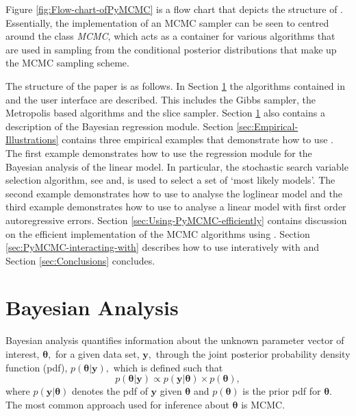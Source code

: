 \documentclass[article]{jss}
\begin{document}
Figure \ref{fig:Flow-chart-ofPyMCMC} is a flow chart that depicts
the structure of . Essentially, the implementation of an MCMC
sampler can be seen to centred around the class \emph{MCMC}, which
acts as a container for various algorithms that are used in sampling
from the conditional posterior distributions that make up the MCMC
sampling scheme. 

The structure of the paper is as follows. In Section \ref{sec:Bayesian-Analysis}
the algorithms contained in  and the user interface are described.
This includes the Gibbs sampler, the Metropolis based algorithms and
the slice sampler. Section \ref{sec:Bayesian-Analysis} also contains
a description of the Bayesian regression module. Section \ref{sec:Empirical-Illustrations}
contains three empirical examples that demonstrate how to use .
The first example demonstrates how to use the regression module for
the Bayesian analysis of the linear model. In particular, the stochastic
search variable selection algorithm, see \citet{GeorgeMcCulloch1993}
and\citet{MarinRobert2007}, is used to select a set of `most likely
models'. The second example demonstrates how to use  to analyse
the loglinear model and the third example demonstrates how to use
 to analyse a linear model with first order autoregressive errors.
Section \ref{sec:Using-PyMCMC-efficiently} contains discussion on
the efficient implementation of the MCMC algorithms using .
Section \ref{sec:PyMCMC-interacting-with} describes how to use 
interatively with  and Section \ref{sec:Conclusions} concludes.


\section{Bayesian Analysis}
\label{sec:Bayesian-Analysis}

Bayesian analysis quantifies information about the unknown parameter
vector of interest, $\bm{\theta},$ for a given data set, $\bm{y},$
through the joint posterior probability density function (pdf),
$p(\bm{\theta}|\bm{y}),$ which is defined such that \begin{equation}
  p(\bm{\theta}|\bm{y})\propto p(\bm{y}|\bm{\theta})\times
  p(\bm{\theta}),\label{eq:joint post}\end{equation} where
$p(\bm{y}|\bm{\theta})$ denotes the pdf of $\bm{y}$ given
$\bm{\theta}$ and $p(\bm{\theta})$ is the prior pdf for $\bm{\theta}.$
The most common approach used for inference about $\bm{\theta}$ is
MCMC.
\end{document}
